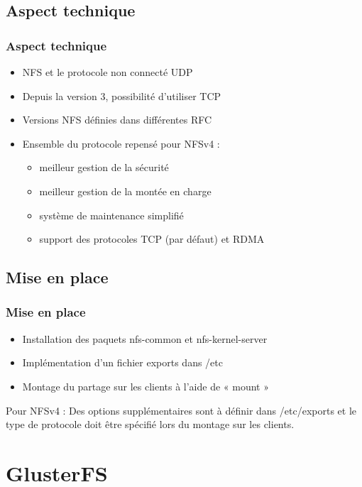 \documentclass[blue]{beamer}
\begin{document}
\subsection{Aspect technique}
\begin{frame}
  \frametitle{Aspect technique}
  \begin{itemize}
    \item NFS et le protocole non connecté UDP
    \item Depuis la version 3, possibilité d'utiliser TCP
    \item Versions NFS définies dans différentes RFC
    \item Ensemble du protocole repensé pour NFSv4 :
    \begin{itemize}
      \item meilleur gestion de la sécurité
      \item meilleur gestion de la montée en charge
      \item système de maintenance simplifié
      \item support des protocoles TCP (par défaut) et RDMA
  \end{itemize}
  \end{itemize}
\end{frame}

\subsection{Mise en place}
	\begin{frame}
		\frametitle{Mise en place}
		\begin{itemize}
			\item Installation des paquets nfs-common et nfs-kernel-server
			\item Implémentation d'un fichier exports dans /etc
			\item Montage du partage sur les clients à l'aide de « mount »
		\end{itemize}
		\begin{block}{Pour NFSv4 :}
			Des options supplémentaires sont à définir dans /etc/exports et le type de protocole doit être spécifié lors du montage sur les clients.
		\end{block}
	\end{frame}
	
\section{GlusterFS}
\end{document}
